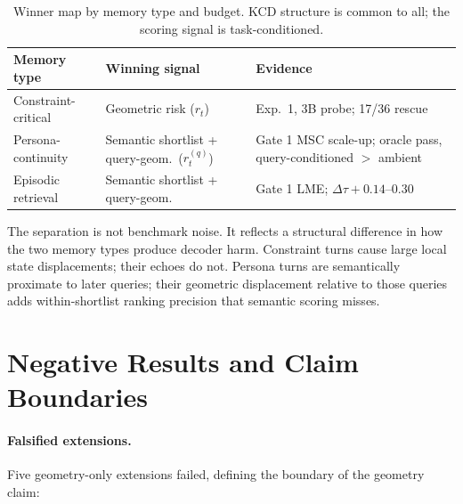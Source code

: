 \documentclass[conference]{IEEEtran}
\begin{document}
\begin{table}[t]
  \centering
  \caption{Winner map by memory type and budget. KCD structure is common to
  all; the scoring signal is task-conditioned.}
  \label{tab:regime}
  \begin{tabular}{p{2.0cm}p{2.5cm}p{2.5cm}}
    \toprule
    Memory type & Winning signal & Evidence \\
    \midrule
    Constraint-critical
      & Geometric risk ($r_t$)
      & Exp.\ 1, 3B probe; 17/36 rescue \\
    Persona-continuity
      & Semantic shortlist + query-geom.\ ($r_t^{(q)}$)
      & Gate 1 MSC scale-up; oracle pass, query-conditioned $>$ ambient \\
    Episodic retrieval
      & Semantic shortlist + query-geom.
      & Gate 1 LME; $\Delta\tau{+}0.14$--$0.30$ \\
    \bottomrule
  \end{tabular}
\end{table}

The separation is not benchmark noise. It reflects a structural difference
in how the two memory types produce decoder harm. Constraint turns cause large
local state displacements; their echoes do not. Persona turns are semantically
proximate to later queries; their geometric displacement relative to those
queries adds within-shortlist ranking precision that semantic scoring misses.

\section{Negative Results and Claim Boundaries}
\label{sec:negative}

\paragraph{Falsified extensions.}
Five geometry-only extensions failed, defining the boundary of the geometry
claim:
\end{document}
